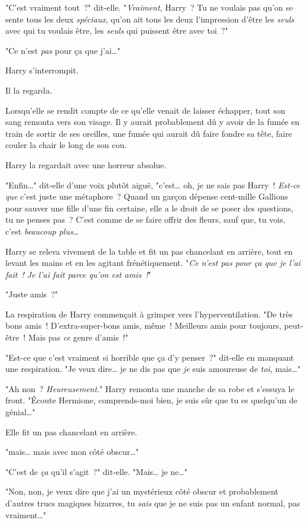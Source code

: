 "C'est vraiment tout~?" dit-elle. "\emph{Vraiment}, Harry~? Tu ne voulais pas qu'on se sente tous les deux \emph{spéciaux}, qu'on ait tous les deux l'impression d'être les \emph{seuls} avec qui tu voulais être, les \emph{seuls} qui puissent être avec toi~?"

"Ce n'est \emph{pas} pour ça que j'ai…"

Harry s'interrompit.

Il la regarda.

Lorsqu'elle se rendit compte de ce qu'elle venait de laisser échapper, tout son sang remonta vers son visage. Il y aurait probablement dû y avoir de la fumée en train de sortir de ses oreilles, une fumée qui aurait dû faire fondre sa tête, faire couler la chair le long de son cou.

Harry la regardait avec une horreur absolue.

"Enfin…" dit-elle d'une voix plutôt aiguë, "c'est… oh, je ne sais pas Harry~! \emph{Est-ce que} c'est juste une métaphore~? Quand un garçon dépense cent-mille Gallions pour sauver une fille d'une fin certaine, elle a le droit de se poser des questions, tu ne penses pas~? C'est comme de se faire offrir des fleurs, sauf que, tu vois, c'est \emph{beaucoup plus}…

Harry se releva vivement de la table et fit un pas chancelant en arrière, tout en levant les mains et en les agitant frénétiquement. "\emph{Ce n'est pas pour ça que je l'ai fait~! Je l'ai fait parce qu'on est amis~!}"

"Juste amis~?"

La respiration de Harry commençait à grimper vers l'hyperventilation. "De très bons amis~! D'extra-super-bons amis, même~! Meilleurs amis pour toujours, peut-être~! Mais pas \emph{ce} genre d'amis~!"

"Est-ce que c'est vraiment si horrible que ça d'y penser~?" dit-elle en manquant une respiration. "Je veux dire… je ne dis pas que \emph{je} suis amoureuse de \emph{toi}, mais…"

"Ah non~? \emph{Heureusement}." Harry remonta une manche de sa robe et s'essuya le front. "Écoute Hermione, comprends-moi bien, je suis sûr que tu es quelqu'un de génial…"

Elle fit un pas chancelant en arrière.

"mais… mais avec mon côté obscur…"

"C'est de \emph{ça} qu'il s'agit~?" dit-elle. "Mais… je ne…"

"Non, non, je veux dire que j'ai un mystérieux côté obscur et probablement d'autres trucs magiques bizarres, tu \emph{sais} que je ne suis pas un enfant normal, pas vraiment…"

